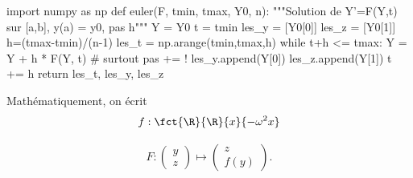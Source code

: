 %
%




\question{}



\begin{pyverbatim}
import numpy as np
def euler(F, tmin, tmax, Y0, n):
    """Solution de Y'=F(Y,t) sur [a,b], y(a) = y0, pas h"""
    Y = Y0
    t = tmin
    les_y = [Y0[0]] 
    les_z = [Y0[1]] 
    h=(tmax-tmin)/(n-1)
    les_t = np.arange(tmin,tmax,h)
    while t+h <= tmax:
        Y = Y + h * F(Y, t) # surtout pas += !
        les_y.append(Y[0])
        les_z.append(Y[1])
        t += h
    return les_t, les_y, les_z
\end{pyverbatim}

%
%
%
%
%
%
%

\question{}

Mathématiquement, on écrit 
\begin{align*}
f:\fct{\R}{\R}{x}{-\omega^2x}
\end{align*}

\begin{align*}
F : \begin{pmatrix} y \\ z \end{pmatrix} \longmapsto \begin{pmatrix} z \\ f(y) \end{pmatrix}.
\end{align*}

